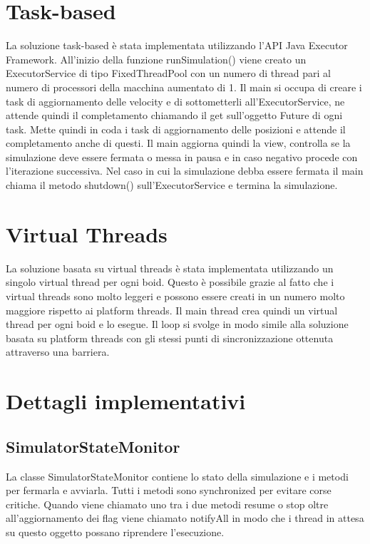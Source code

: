 \documentclass[11pt,notitlepage]{article}
\begin{document}
\newpage
\section{Task-based}
La soluzione task-based è stata implementata utilizzando l'API Java Executor Framework. All'inizio della funzione \textsf{runSimulation()} viene creato un 
\textsf{ExecutorService} di tipo \textsf{FixedThreadPool} con un numero di thread pari al numero di processori della macchina aumentato di 1.
Il main si occupa di creare i task di aggiornamento delle velocity e di sottometterli all'\textsf{ExecutorService}, ne attende quindi il completamento 
chiamando il get sull'oggetto \textsf{Future} di ogni task. Mette quindi in coda i task di aggiornamento delle posizioni e attende il completamento anche di 
questi. Il main aggiorna quindi la view, controlla se la simulazione deve essere fermata o messa in pausa e in caso negativo procede con l'iterazione successiva.
Nel caso in cui la simulazione debba essere fermata il main chiama il metodo \textsf{shutdown()} sull'\textsf{ExecutorService} e termina la simulazione.

\section{Virtual Threads}
La soluzione basata su virtual threads è stata implementata utilizzando un singolo virtual thread per ogni boid. Questo è possibile
grazie al fatto che i virtual threads sono molto leggeri e possono essere creati in un numero molto maggiore rispetto ai platform threads.
Il main thread crea quindi un virtual thread per ogni boid e lo esegue. Il loop si svolge in modo simile alla soluzione basata su platform threads con gli stessi punti
di sincronizzazione ottenuta attraverso una barriera.

\section{Dettagli implementativi}
\subsection{SimulatorStateMonitor}
La classe \textsf{SimulatorStateMonitor} contiene lo stato della simulazione e i metodi per fermarla e avviarla. Tutti i metodi sono \textsf{synchronized} per evitare
corse critiche. Quando viene chiamato uno tra i due metodi \textsf{resume} o \textsf{stop} oltre all'aggiornamento dei flag viene chiamato \textsf{notifyAll} in modo
che i thread in attesa su questo oggetto possano riprendere l'esecuzione.
\end{document}
